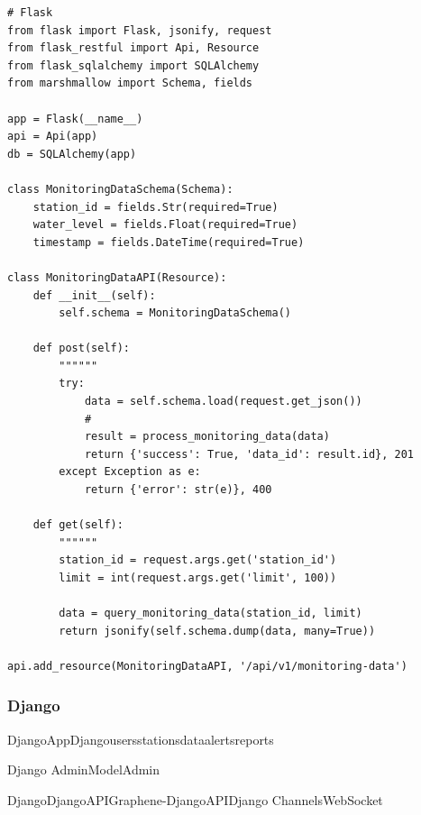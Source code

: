 \begin{lstlisting}[style=python]
# Flask
from flask import Flask, jsonify, request
from flask_restful import Api, Resource
from flask_sqlalchemy import SQLAlchemy
from marshmallow import Schema, fields

app = Flask(__name__)
api = Api(app)
db = SQLAlchemy(app)

class MonitoringDataSchema(Schema):
    station_id = fields.Str(required=True)
    water_level = fields.Float(required=True)
    timestamp = fields.DateTime(required=True)

class MonitoringDataAPI(Resource):
    def __init__(self):
        self.schema = MonitoringDataSchema()
    
    def post(self):
        """"""
        try:
            data = self.schema.load(request.get_json())
            # 
            result = process_monitoring_data(data)
            return {'success': True, 'data_id': result.id}, 201
        except Exception as e:
            return {'error': str(e)}, 400
    
    def get(self):
        """"""
        station_id = request.args.get('station_id')
        limit = int(request.args.get('limit', 100))
        
        data = query_monitoring_data(station_id, limit)
        return jsonify(self.schema.dump(data, many=True))

api.add_resource(MonitoringDataAPI, '/api/v1/monitoring-data')
\end{lstlisting}

\hypertarget{django-3}{%
\subsubsection{Django}\label{django-3}}

\important{}DjangoAppDjango\important{}users\important{}stations\important{}data\important{}alerts\important{}reports

\important{}Django
Admin\important{}\important{}ModelAdmin\important{}\important{}\important{}

\important{}DjangoDjangoAPIGraphene-DjangoAPI\important{}Django
ChannelsWebSocket

